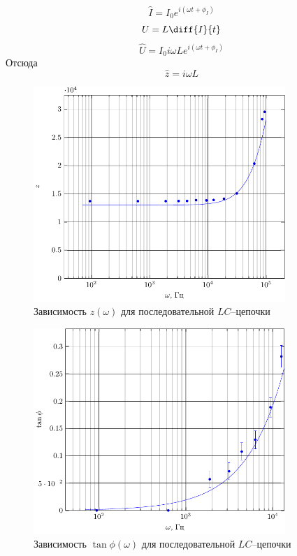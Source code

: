 \begin{equation}
	\hat{I}=I_0e^{i(\omega t+\phi_I)}
\end{equation}
\begin{equation}
	U=L\diff{I}{t}
\end{equation}
\begin{equation}
	\hat{U}=I_0i\omega L e^{i(\omega t +\phi_I)}
\end{equation}
Отсюда
\begin{equation}
	\hat{z}=i\omega L
	\end{equation}

\begin{figure}[H]
	\centering
	\includegraphics[width=0.85\textwidth]{img/chem2_z}
	\caption{Зависимость $z(\omega)$ для последовательной $LC$--цепочки}
	\label{fig:figure1}
\end{figure}
\begin{figure}[H]
	\centering
	\includegraphics[width=0.85\textwidth]{img/chem2_phi} 
	\caption{Зависимость $\tan\phi(\omega)$ для последовательной $LC$--цепочки}
	\label{fig:figure1}
\end{figure}

